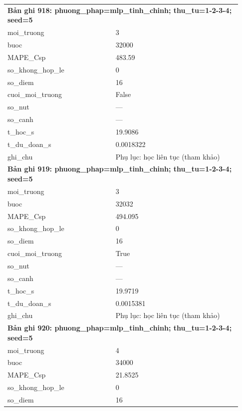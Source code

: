 \begin{longtable}{p{0.43\linewidth}p{0.50\linewidth}}
\midrule
\multicolumn{2}{p{0.95\linewidth}}{\textbf{Bản ghi 918: phuong\_phap=mlp\_tinh\_chinh; thu\_tu=1-2-3-4; seed=5}} \\
moi\_\allowbreak truong & 3 \\
buoc & 32000 \\
MAPE\_\allowbreak Csp & 483.59 \\
so\_\allowbreak khong\_\allowbreak hop\_\allowbreak le & 0 \\
so\_\allowbreak diem & 16 \\
cuoi\_\allowbreak moi\_\allowbreak truong & False \\
so\_\allowbreak nut & — \\
so\_\allowbreak canh & — \\
t\_\allowbreak hoc\_\allowbreak s & 19.9086 \\
t\_\allowbreak du\_\allowbreak doan\_\allowbreak s & 0.0018322 \\
ghi\_\allowbreak chu & Phụ lục: học liên tục (tham khảo) \\
\midrule
\multicolumn{2}{p{0.95\linewidth}}{\textbf{Bản ghi 919: phuong\_phap=mlp\_tinh\_chinh; thu\_tu=1-2-3-4; seed=5}} \\
moi\_\allowbreak truong & 3 \\
buoc & 32032 \\
MAPE\_\allowbreak Csp & 494.095 \\
so\_\allowbreak khong\_\allowbreak hop\_\allowbreak le & 0 \\
so\_\allowbreak diem & 16 \\
cuoi\_\allowbreak moi\_\allowbreak truong & True \\
so\_\allowbreak nut & — \\
so\_\allowbreak canh & — \\
t\_\allowbreak hoc\_\allowbreak s & 19.9719 \\
t\_\allowbreak du\_\allowbreak doan\_\allowbreak s & 0.0015381 \\
ghi\_\allowbreak chu & Phụ lục: học liên tục (tham khảo) \\
\midrule
\multicolumn{2}{p{0.95\linewidth}}{\textbf{Bản ghi 920: phuong\_phap=mlp\_tinh\_chinh; thu\_tu=1-2-3-4; seed=5}} \\
moi\_\allowbreak truong & 4 \\
buoc & 34000 \\
MAPE\_\allowbreak Csp & 21.8525 \\
so\_\allowbreak khong\_\allowbreak hop\_\allowbreak le & 0 \\
so\_\allowbreak diem & 16 \\

\end{longtable}
